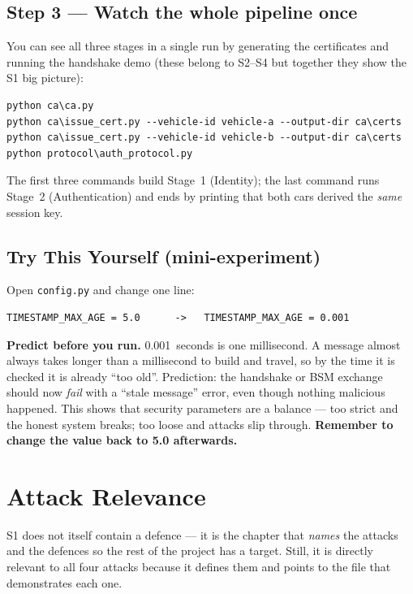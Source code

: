 \documentclass[11pt,a4paper]{report}
\begin{document}
\subsection{Step 3 --- Watch the whole pipeline once}
You can see all three stages in a single run by generating the certificates and
running the handshake demo (these belong to S2--S4 but together they show the
S1 big picture):
\begin{lstlisting}[style=term]
python ca\ca.py
python ca\issue_cert.py --vehicle-id vehicle-a --output-dir ca\certs
python ca\issue_cert.py --vehicle-id vehicle-b --output-dir ca\certs
python protocol\auth_protocol.py
\end{lstlisting}
The first three commands build Stage~1 (Identity); the last command runs
Stage~2 (Authentication) and ends by printing that both cars derived the
\emph{same} session key.

\subsection{Try This Yourself (mini-experiment)}
Open \texttt{config.py} and change one line:
\begin{lstlisting}[style=term]
TIMESTAMP_MAX_AGE = 5.0      ->   TIMESTAMP_MAX_AGE = 0.001
\end{lstlisting}
\textbf{Predict before you run.} 0.001~seconds is one millisecond. A message
almost always takes longer than a millisecond to build and travel, so by the
time it is checked it is already ``too old''. Prediction: the handshake or BSM
exchange should now \emph{fail} with a ``stale message'' error, even though
nothing malicious happened. This shows that security parameters are a balance ---
too strict and the honest system breaks; too loose and attacks slip through.
\textbf{Remember to change the value back to 5.0 afterwards.}

\section{Attack Relevance}

S1 does not itself contain a defence --- it is the chapter that \emph{names} the
attacks and the defences so the rest of the project has a target. Still, it is
directly relevant to all four attacks because it defines them and points to the
file that demonstrates each one.
\end{document}

